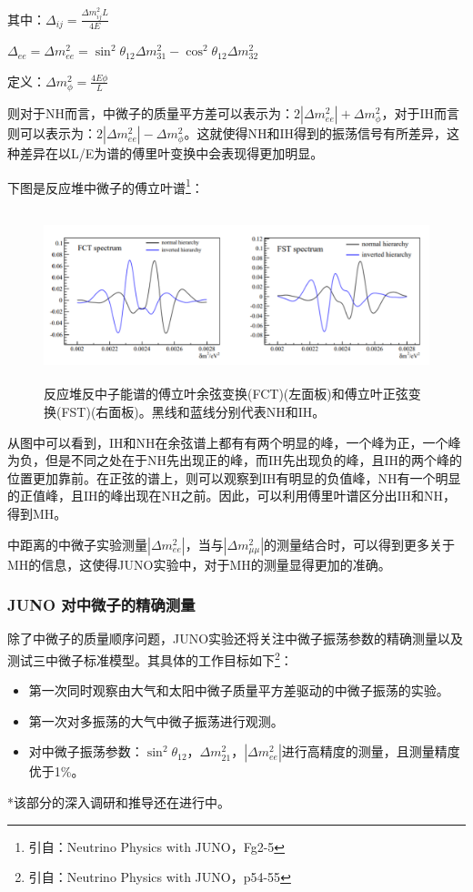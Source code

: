 \documentclass[15pt,a4paper]{article}
\begin{document}
其中：$\Delta_{ij}=\frac{\Delta{m_{ij}^2}L}{4E}$

$\Delta_{ee}=\Delta{m_{ee}^2}=\sin^2{\theta_{12}}\Delta{m_{31}^2}-\cos^2{\theta_{12}}\Delta{m_{32}^2}$

定义：$\Delta{m_{\phi}^2}=\frac{4E\phi}{L}$

则对于NH而言，中微子的质量平方差可以表示为：$2|\Delta{m_{ee}^2}|+\Delta{m_{\phi}^2}$，对于IH而言则可以表示为：$2|\Delta{m_{ee}^2}|-\Delta{m_{\phi}^2}$。这就使得NH和IH得到的振荡信号有所差异，这种差异在以L/E为谱的傅里叶变换中会表现得更加明显。

下图是反应堆中微子的傅立叶谱\footnote{引自：Neutrino Physics with JUNO，Fg2-5}：

\begin{figure}[ht]
 \centering
 \includegraphics[height=5cm]{images/傅里叶图谱.png}
 \caption{反应堆反中子能谱的傅立叶余弦变换(FCT)(左面板)和傅立叶正弦变换(FST)(右面板)。黑线和蓝线分别代表NH和IH。}
 \label{fig:singleblock}
\end{figure}

从图中可以看到，IH和NH在余弦谱上都有有两个明显的峰，一个峰为正，一个峰为负，但是不同之处在于NH先出现正的峰，而IH先出现负的峰，且IH的两个峰的位置更加靠前。在正弦的谱上，则可以观察到IH有明显的负值峰，NH有一个明显的正值峰，且IH的峰出现在NH之前。因此，可以利用傅里叶谱区分出IH和NH，得到MH。

中距离的中微子实验测量$|\Delta{m_{ee}^2}|$，当与$|\Delta{m_{\mu\mu}^2}|$的测量结合时，可以得到更多关于MH的信息，这使得JUNO实验中，对于MH的测量显得更加的准确。

\subsubsection{JUNO 对中微子的精确测量}\label{sub:logicinter}

除了中微子的质量顺序问题，JUNO实验还将关注中微子振荡参数的精确测量以及测试三中微子标准模型。其具体的工作目标如下\footnote{引自：Neutrino Physics with JUNO，p54-55}：

\begin{itemize}
	\item{第一次同时观察由大气和太阳中微子质量平方差驱动的中微子振荡的实验。}
    \item{第一次对多振荡的大气中微子振荡进行观测。}
    \item{对中微子振荡参数：$\sin^2{\theta_{12}}$，$\Delta m^2_{21}$，$|\Delta m^2_{ee}|$进行高精度的测量，且测量精度优于1\%。}
\end{itemize}
*该部分的深入调研和推导还在进行中。
\end{document}
